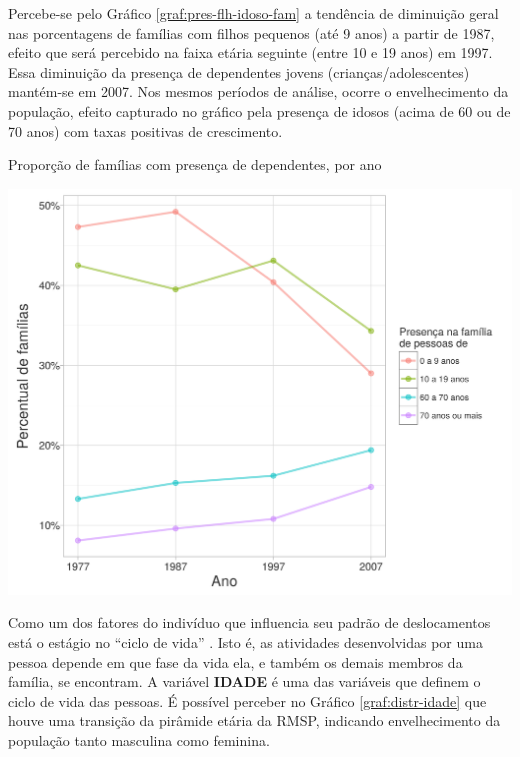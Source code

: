 Percebe-se pelo Gráfico \ref{graf:pres-flh-idoso-fam} a tendência de diminuição geral nas porcentagens de famílias com filhos pequenos (até 9 anos) a partir de 1987, efeito que será percebido na faixa etária seguinte (entre 10 e 19 anos) em 1997. Essa diminuição da presença de dependentes jovens (crianças/adolescentes) mantém-se em 2007. Nos mesmos períodos de análise, ocorre o envelhecimento da população, efeito capturado no gráfico pela presença de idosos (acima de 60 ou de 70 anos) com taxas positivas de crescimento.

\begin{grafico}[htb]%
    \caption{\label{graf:pres-flh-idoso-fam}Proporção de famílias com presença de dependentes, por ano}%
    \begin{center}%
        \includegraphics[width=1\textwidth]{./imagens/pres-flh-idoso-fam.png}%
    \end{center}%
\end{grafico}%

Como um dos fatores do indivíduo que influencia seu padrão de deslocamentos está o estágio no ``ciclo de vida'' \cite{BILT1997}.
Isto é, as atividades desenvolvidas por uma pessoa depende em que fase da vida ela, e também os demais membros da família, se encontram. A variável \textbf{IDADE} é uma das variáveis que definem o ciclo de vida das pessoas. É possível perceber no Gráfico \ref{graf:distr-idade} que houve uma transição da pirâmide etária da RMSP, indicando envelhecimento da população tanto masculina como feminina.

